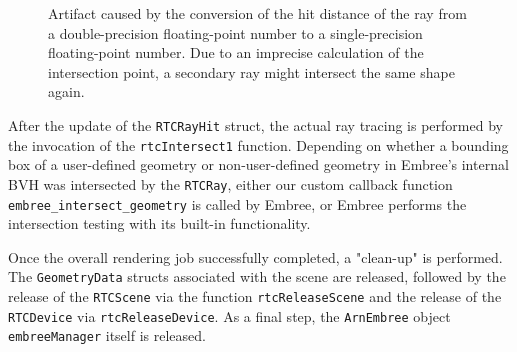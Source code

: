 \begin{figure}[!tbp]
	\centering
	\hfil
	\caption{Artifact caused by the conversion of the hit distance of the ray from a double-precision floating-point number to a single-precision floating-point number. Due to an imprecise calculation of the intersection point, a secondary ray might intersect the same shape again.}
	\label{fig:offset}
\end{figure}

After the update of the \texttt{RTCRayHit} struct, the actual ray tracing is performed by the invocation of the \texttt{rtcIntersect1} function. Depending on whether a bounding box of a user-defined geometry or non-user-defined geometry in Embree's internal BVH was intersected by the \texttt{RTCRay}, either our custom callback function \texttt{embree\_intersect\_geometry} is called by Embree, or Embree performs the intersection testing with its built-in functionality.

Once the overall rendering job successfully completed, a "clean-up" is performed. The \texttt{GeometryData} structs associated with the scene are released, followed by the release of the \texttt{RTCScene} via the function \texttt{rtcReleaseScene} and the release of the \texttt{RTCDevice} via \texttt{rtcReleaseDevice}. As a final step, the \texttt{ArnEmbree} object \texttt{embreeManager} itself is released.


